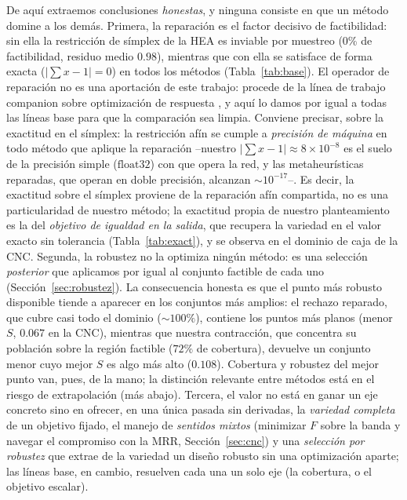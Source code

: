\documentclass[5p,times,authoryear]{elsarticle}
\begin{document}
De aquí extraemos conclusiones \emph{honestas}, y ninguna consiste en que un método
domine a los demás. Primera, la reparación es el factor decisivo de factibilidad:
sin ella la restricción de símplex de la HEA es inviable por muestreo (0\% de
factibilidad, residuo medio $0.98$), mientras que con ella se satisface de forma
exacta ($|\sum x-1|=0$) en todos los métodos (Tabla~\ref{tab:base}). El
operador de reparación no es una aportación de este trabajo: procede de la línea de
trabajo companion sobre optimización de respuesta \citep{scala2026idc}, y aquí lo
damos por igual a todas las líneas base para que la comparación sea limpia. Conviene
precisar, sobre la exactitud en el símplex: la restricción afín se cumple a
\emph{precisión de máquina} en todo método que aplique la reparación --nuestro
$|\sum x-1|\approx8\times10^{-8}$ es el suelo de la precisión simple ($\mathrm{float32}$)
con que opera la red, y las metaheurísticas reparadas, que operan en doble precisión,
alcanzan $\sim10^{-17}$--. Es decir, la exactitud sobre el símplex proviene de la
reparación afín compartida, no es una particularidad de nuestro método; la exactitud
propia de nuestro planteamiento es la del \emph{objetivo de igualdad en la salida}, que
recupera la variedad en el valor exacto sin tolerancia (Tabla~\ref{tab:exact}), y se
observa en el dominio de caja de la CNC. Segunda,
la robustez no la optimiza ningún método: es una selección \emph{posterior} que aplicamos
por igual al conjunto factible de cada uno (Sección~\ref{sec:robustez}). La consecuencia
honesta es que el punto más robusto disponible tiende a aparecer en los conjuntos más
amplios: el rechazo reparado, que cubre casi todo el dominio ($\sim100\%$), contiene los
puntos más planos (menor $S$, $0.067$ en la CNC), mientras que nuestra contracción, que
concentra su población sobre la región factible ($72\%$ de cobertura), devuelve un conjunto
menor cuyo mejor $S$ es algo más alto ($0.108$). Cobertura y robustez del mejor punto van,
pues, de la mano; la distinción relevante entre métodos está en el riesgo de extrapolación
(más abajo). Tercera,
el valor no está en ganar un eje concreto sino en ofrecer, en una única pasada sin
derivadas, la \emph{variedad completa} de un objetivo fijado, el manejo de \emph{sentidos
mixtos} (minimizar $F$ sobre la banda y navegar el compromiso con la MRR,
Sección~\ref{sec:cnc}) y una \emph{selección por robustez} que extrae de la variedad un
diseño robusto sin una optimización aparte; las líneas base, en cambio, resuelven cada una
un solo eje (la cobertura, o el objetivo escalar).
\end{document}
